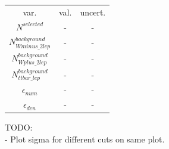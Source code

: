 \begin{tabular}{ c | c | c }
  \hline			
  var. & val. & uncert. \\
  
  $N^{selected}$ & - & - \\
  
  $N^{background}_{Wminus\_2lep}$ & - & - \\
  
  $N^{background}_{Wplus\_2lep}$ & - & - \\
  
  $N^{background}_{ttbar\_lep}$ & - & - \\
  
  $\epsilon_{num}$ & - & - \\
  
  $\epsilon_{den}$ & - & - \\
  \hline  
\end{tabular}




TODO:
\\
 - Plot sigma for different cuts on same plot.

